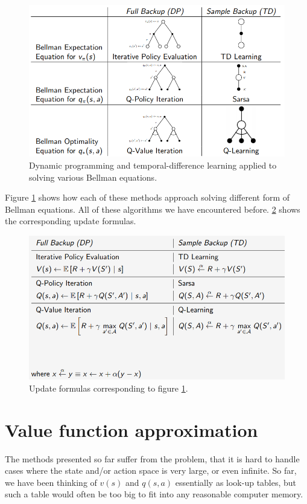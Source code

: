 \documentclass[12pt, a4paper]{article}
\numberwithin{equation}{section}
\begin{document}
\begin{figure}
\centering
\includegraphics[width=\textwidth]{DPvsTD}
\caption{Dynamic programming and temporal-difference learning applied to solving various Bellman equations.}
\label{fig:DPvsTD}
\end{figure}

Figure \ref{fig:DPvsTD} shows how each of these methods approach solving different form of Bellman equations. All of these algorithms we have encountered before. \ref{fig:DPvsTD2} shows the corresponding update formulas.

\begin{figure}
\centering
\includegraphics[width=\textwidth]{DPvsTD2}
\caption{Update formulas corresponding to figure \ref{fig:DPvsTD}.}
\label{fig:DPvsTD2}
\end{figure}

\section{Value function approximation}
The methods presented so far suffer from the problem, that it is hard to handle cases where the state and/or action space is very large, or even infinite. So far, we have been thinking of $v(s)$ and $q(s,a)$ essentially as look-up tables, but such a table would often be too big to fit into any reasonable computer memory.
\end{document}

